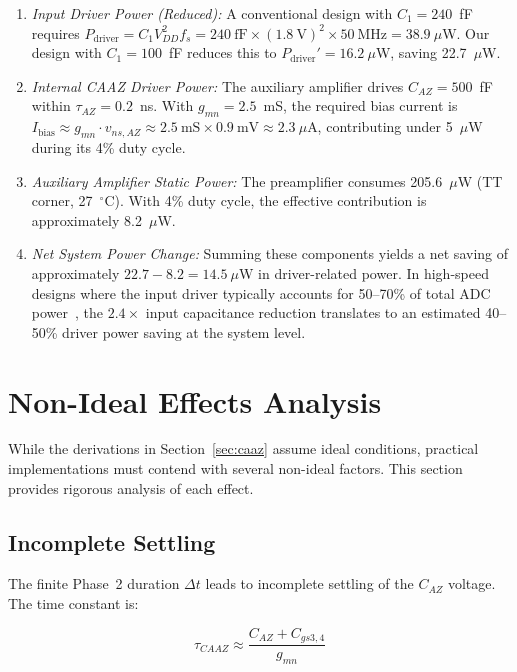 \documentclass[journal]{IEEEtran}
\begin{document}
\begin{enumerate}
    \item \textit{Input Driver Power (Reduced):} A conventional design with $C_1=240$~fF requires $P_{\text{driver}} = C_1 V_{DD}^2 f_s = 240~\text{fF} \times (1.8~\text{V})^2 \times 50~\text{MHz} = 38.9~\mu$W. Our design with $C_1=100$~fF reduces this to $P_{\text{driver}}' = 16.2~\mu$W, saving 22.7~$\mu$W.

    \item \textit{Internal CAAZ Driver Power:} The auxiliary amplifier drives $C_{AZ}=500$~fF within $\tau_{AZ}=0.2$~ns. With $g_{mn}=2.5$~mS, the required bias current is $I_{\text{bias}} \approx g_{mn} \cdot v_{ns,AZ} \approx 2.5~\text{mS} \times 0.9~\text{mV} \approx 2.3~\mu$A, contributing under 5~$\mu$W during its 4\% duty cycle.

    \item \textit{Auxiliary Amplifier Static Power:} The preamplifier consumes 205.6~$\mu$W (TT corner, 27~$^\circ$C). With 4\% duty cycle, the effective contribution is approximately 8.2~$\mu$W.

    \item \textit{Net System Power Change:} Summing these components yields a net saving of approximately $22.7 - 8.2 = 14.5~\mu$W in driver-related power. In high-speed designs where the input driver typically accounts for 50--70\% of total ADC power~\cite{won2024_13b}, the $2.4\times$ input capacitance reduction translates to an estimated 40--50\% driver power saving at the system level.
\end{enumerate}

\section{Non-Ideal Effects Analysis}
\label{sec:nonideal}

While the derivations in Section~\ref{sec:caaz} assume ideal conditions, practical implementations must contend with several non-ideal factors. This section provides rigorous analysis of each effect.

\subsection{Incomplete Settling}

The finite Phase~2 duration $\Delta t$ leads to incomplete settling of the $C_{AZ}$ voltage. The time constant is:

\begin{equation}
\tau_{CAAZ} \approx \frac{C_{AZ} + C_{gs3,4}}{g_{mn}}
\label{eq:tau_caaz}
\end{equation}
\end{document}
